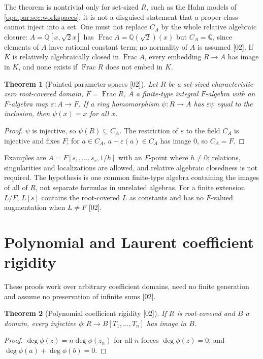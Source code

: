 \documentclass[11pt,oneside]{article}
\numberwithin{equation}{section}
\newtheorem{theorem}{Theorem}[section]
\theoremstyle{definition}
\theoremstyle{remark}
\newcommand{\Q}{\mathbb Q}
\newcommand{\Frac}{\operatorname{Frac}}
\newcommand{\src}[1]{\textup{\textsf{\small[#1]}}}
\begin{document}
The theorem is nontrivial only for set-sized $R$, such as the Hahn models of
\cref{opa:par:sec:workspaces}; it is not a disguised statement that a proper class
cannot inject into a set. One must not replace $C_A$ by the whole relative algebraic
closure: $A=\Q[x,\sqrt2x]$ has $\Frac A=\Q(\sqrt2)(x)$ but $C_A=\Q$, since elements of
$A$ have rational constant term; no normality of $A$ is assumed \src{02}. If $K$ is
relatively algebraically closed in $\Frac A$, every embedding $R\to A$ has image in
$K$, and none exists if $\Frac R$ does not embed in $K$.

\begin{theorem}[Pointed parameter spaces \src{02}]\label{opa:par:thm:pointed}
Let $R$ be a set-sized characteristic-zero root-covered domain, $F=\Frac R$, $A$ a
finite-type integral $F$-algebra with an $F$-algebra map $\varepsilon:A\to F$. If a
ring homomorphism $\psi:R\to A$ has $\varepsilon\psi$ equal to the inclusion, then
$\psi(x)=x$ for all $x$.
\end{theorem}
\begin{proof}
$\psi$ is injective, so $\psi(R)\subseteq C_A$. The restriction of $\varepsilon$ to the
field $C_A$ is injective and fixes $F$; for $a\in C_A$, $a-\varepsilon(a)\in C_A$ has
image $0$, so $C_A=F$.
\end{proof}

Examples are $A=F[s_1,\dots,s_r,1/h]$ with an $F$-point where $h\ne0$; relations,
singularities and localizations are allowed, and relative algebraic closedness is not
required. The hypothesis is one common finite-type algebra containing the images of
all of $R$, not separate formulas in unrelated algebras. For a finite extension
$L/F$, $L[s]$ contains the root-covered $L$ as constants and has no $F$-valued
augmentation when $L\ne F$ \src{02}.

\section{Polynomial and Laurent coefficient rigidity}\label{opa:par:sec:coefficient}

These proofs work over arbitrary coefficient domains, need no finite generation and
assume no preservation of infinite sums \src{02}.

\begin{theorem}[Polynomial coefficient rigidity \src{02}]\label{opa:par:thm:poly}
If $R$ is root-covered and $B$ a domain, every injective $\phi:R\to B[T_1,\dots,T_n]$
has image in $B$.
\end{theorem}
\begin{proof}
$\deg\phi(z)=n\deg\phi(z_n)$ for all $n$ forces $\deg\phi(z)=0$, and
$\deg\phi(a)+\deg\phi(b)=0$.
\end{proof}
\end{document}
